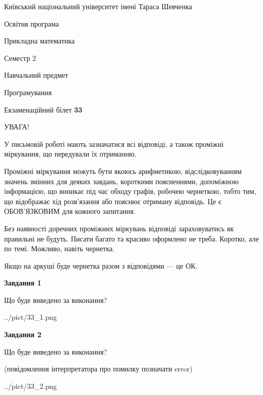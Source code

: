 \documentclass[12pt, ukrainian]{article}
\begin{document}
{{\begin {small}\par
{ \center  Київський національний університет імені Тараса Шевченка \par}
{\parbox {5 cm}{Освітня програма \hfill}{\parbox {7 cm}{Прикладна математика\hfill}}\parbox {6 cm}{\hfill Семестр 2}}\par
{\parbox {5 cm} {Навчальний предмет \hfill}\parbox {7 cm}{Програмування \hfill}\parbox {6cm}{\hfill}\par}\vspace{-7pt} \end{small}}{\center Екзаменаційний білет \No \textbf
{ 33 }\par}}
{
\begin {large}
УВАГА!

У письмовій роботі мають зазначатися всі відповіді, а також проміжні міркування, що передували їх отриманню.

Проміжні міркування можуть бути якоюсь арифметикою, відслідковуванням зна\-чень змінних для деяких завдань,
короткими поясненнями, допоміжною інформацією, що виникає під час обходу графів, робочею чернеткою,
тобто тим, що відображає хід розв’язання або пояснює отриману відповідь.
Це є ОБОВ’ЯЗКОВИМ для кожного запитання.

Без наявності доречних проміжних міркувань відповіді зараховуватись як правиль\-ні не будуть.
Писати багато та красиво оформлено не треба. Коротко, але по темі. Можли\-во, навіть чернетка.

Якщо на аркуші буде чернетка разом з відповідями --- це ОК.

\newpage

{\begin {center}\textbf{Завдання 1}\end {center}}\par
Що буде виведено за виконання?\par
\begin{center}
	{../pict/33_1.png}
\end{center}
\newpage

{\begin {center}\textbf{Завдання 2}\end {center}}\par
Що буде виведено за виконання?\par
 (повідомлення інтерпретатора про помилку позначати error)\par
\begin{center}
	{../pict/33_2.png}
\end{center}
\newpage


\end{large}}
\end{document}
